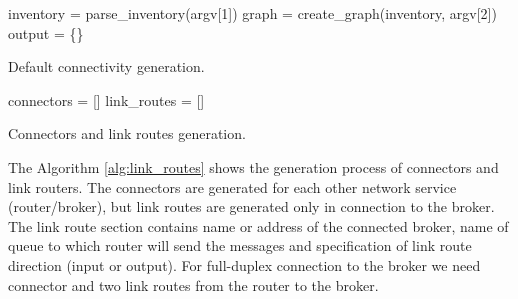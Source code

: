 \begin{center}
	\begin{algorithm}[H]
		\LinesNumbered
		\DontPrintSemicolon


		\var inventory = parse\_inventory(argv[1])\;
		\var graph = create\_graph(inventory, argv[2])\;
		\var output = \{\}\;

		 \caption{Default connectivity generation.}
		 \label{alg:default_connections}
	\end{algorithm}
\end{center}

\begin{center}
	\begin{algorithm}[H]
		\LinesNumbered
		\DontPrintSemicolon


		\var connectors = []\;
		\var link\_routes = []\;
		 \caption{Connectors and link routes generation.}
		 \label{alg:link_routes}
	\end{algorithm}
\end{center}

The Algorithm \ref{alg:link_routes} shows the generation process of connectors and link routers. The connectors are generated for each other network service (router/broker), but link routes are generated only in connection to the broker. The link route section contains name or address of the connected broker, name of queue to which router will send the messages and specification of link route direction (input or output). For full-duplex connection to the broker we need connector and two link routes from the router to the broker.

